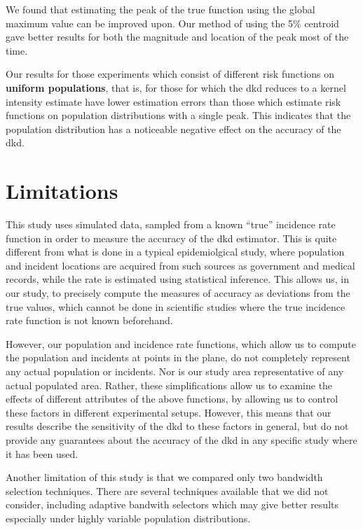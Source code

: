 We found that estimating the peak of the true function using the global maximum value can be improved upon.
Our method of using the 5\% centroid gave better results for both the magnitude and location of the peak most of the time.

Our results for those experiments which consist of different \gls{risk} functions on
\textbf{uniform populations},
that is,
for those for which the \gls{dkd} reduces to a kernel intensity estimate
have lower estimation errors than those which estimate
\gls{risk} functions on population distributions with a single peak.
This indicates that the population distribution has a noticeable negative effect on the accuracy of the \gls{dkd}.

\section{Limitations}
\label{sec:discussion:limitations}

This study uses simulated data,
sampled from a known ``true'' incidence rate function in order to measure the accuracy of the \gls{dkd} estimator.
This is quite different from what is done in a typical epidemiolgical study,
where population and incident locations are acquired from such sources as government and medical records,
while the rate is estimated using statistical inference.
This allows us,
in our study,
to precisely compute the measures of accuracy as deviations from the true values,
which cannot be done in scientific studies where the true incidence rate function is not known beforehand.

However,
our population and incidence rate functions,
which allow us to compute the population and incidents at points in the plane,
do not completely represent any actual population or incidents.
Nor is our study area representative of any actual populated area.
Rather,
these simplifications allow us to examine the effects of different attributes of the above functions,
by allowing us to control these factors in different experimental setups.
However,
this means that our results describe the sensitivity of the \gls{dkd} to these factors in general,
but do not provide any guarantees about the accuracy of the \gls{dkd} in any specific study where it has been used.

Another limitation of this study is that we compared only two bandwidth selection techniques.
There are several techniques available that we did not consider,
including adaptive bandwith selectors which may give better results especially under highly variable population distributions.

